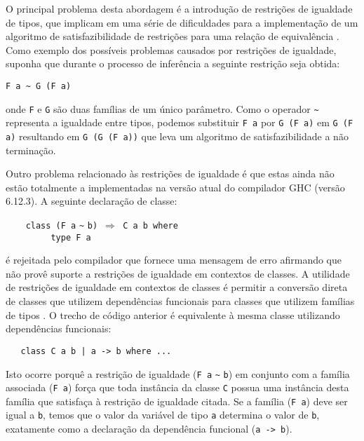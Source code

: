 O principal problema desta abordagem \'e a introdu\c{c}\~ao de restri\c{c}\~oes de igualdade de tipos, que 
implicam em uma s\'erie de dificuldades para a implementa\c{c}\~ao de um algoritmo de satisfazibilidade de
restri\c{c}\~oes para uma rela\c{c}\~ao de equival\^encia \cite{Jones08}. Como exemplo dos poss\'iveis problemas
causados por restri\c{c}\~oes de igualdade, suponha que durante o processo de infer\^encia a seguinte 
restri\c{c}\~ao seja obtida:
\begin{center}
	\verb|F a ~ G (F a)|
\end{center} 
onde \texttt{F} e \texttt{G} s\~ao duas fam\'ilias de um \'unico par\^ametro. Como o operador \verb|~| representa 
a igualdade entre tipos, podemos substituir \texttt{F a} por \texttt{G (F a)} em \texttt{G (F a)} resultando
em \texttt{G (G (F a))} que leva um algoritmo de satisfazibilidade a n\~ao termina\c{c}\~ao. 
 
Outro problema relacionado \`as restri\c{c}\~oes de igualdade \'e que estas ainda n\~ao est\~ao totalmente 
a implementadas na vers\~ao atual do compilador GHC (vers\~ao 6.12.3). A seguinte declara\c{c}\~ao de classe: 
\begin{flushleft}
\verb|    |\texttt{class (F a} \verb|~| \texttt{b) $\Rightarrow$ C a b where}\\
\verb|         type F a|
\end{flushleft}
\'e rejeitada pelo compilador que fornece uma mensagem de erro afirmando que n\~ao prov\^e suporte a restri\c{c}\~oes de
 igualdade em contextos de classes. A utilidade de restri\c{c}\~oes de igualdade em contextos de classes \'e
 permitir a convers\~ao direta de classes que utilizem depend\^encias funcionais para classes que utilizem 
 fam\'ilias de tipos \cite{Jones08}. O trecho de c\'odigo anterior \'e equivalente \`a mesma classe utilizando
  depend\^encias funcionais:
 \begin{flushleft}
 \verb|   |\texttt{class C a b | a -> b where ...}
 \end{flushleft}
Isto ocorre porqu\^e a restri\c{c}\~ao de igualdade (\texttt{F a} \verb|~| \texttt{b}) em conjunto com a fam\'ilia 
associada (\texttt{F a}) for\c{c}a que toda inst\^ancia da classe \texttt{C} possua uma inst\^ancia desta fam\'ilia
que satisfa\c{c}a \`a restri\c{c}\~ao de igualdade citada. Se a fam\'ilia (\texttt{F a}) deve ser igual a \texttt{b},
temos que o valor da vari\'avel de tipo \texttt{a} determina o valor de \texttt{b}, exatamente como a declara\c{c}\~ao
da depend\^encia funcional (\texttt{a -> b}).

